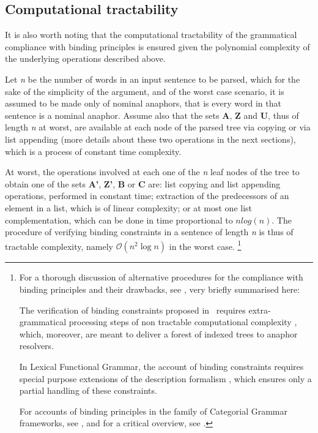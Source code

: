 \documentclass[output=paper
,modfonts
,nonflat]{langsci/langscibook}
\begin{document}
\subsection{Computational tractability} 

It is also worth noting that the computational
tractability of the grammatical compliance with binding principles
is ensured given the polynomial complexity of the underlying operations
described above. 

Let {\it n} be
the number of words in an input sentence to be parsed, which for the
sake of the simplicity of the argument, and of the worst case scenario, 
it is assumed to be made only of nominal anaphors, that is every word in that sentence is a nominal anaphor. 
Assume also that the sets {\bf A}, {\bf Z} and {\bf U}, thus of length {\it n} at worst, 
are available at each node of the parsed tree via copying or via list appending 
(more details about these two operations in
the next sections), which is a process of constant time complexity. 

At worst, the operations involved at each one of the {\em n}
leaf nodes of the tree to obtain one of the sets {\bf A'}, {\bf Z'}, {\bf B} or {\bf C} are:
list copying and list appending operations, performed in constant time; extraction
of the predecessors of an element in a list, which is of linear complexity;
or at most one list complementation, which can be
done in time proportional to $n log(n)$. The procedure of verifying binding constraints in a sentence
of length {\it n} is thus of tractable complexity, namely $\mathcal{O}(n^2\log{}n)$ in the worst case.%
%
\footnote{
For a thorough discussion of alternative procedures for the compliance
with binding principles and their drawbacks, see \citep{branco:esslli2000}, very briefly summarised here:

The verification of binding constraints proposed in~\citep{chom:bind80,chom:lect81} requires extra-grammatical processing
steps of non tractable computational complexity \citep{correa:bind88, fong:index90}, which, moreover, 
are meant to deliver a forest of indexed
trees to anaphor resolvers. 

In Lexical Functional Grammar, the account of binding constraints requires special purpose 
extensions of the description
formalism \citep{dal:bind93}, which ensures only a partial handling
of these constraints.

For accounts of binding principles in  the family of Categorial Grammar frameworks, 
see \citep{szabol:89, hepple:90, morrill:2000}, 
and for a critical overview, see \citep{jaeger:2001}.
}
\end{document}

